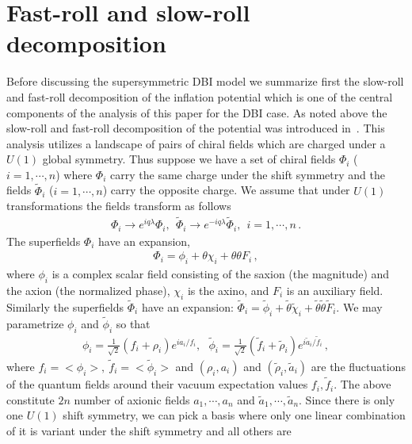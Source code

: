 \documentclass[a4paper,11pt]{article}
\begin{document}
\section{Fast-roll and slow-roll decomposition \label{sec2}}
  Before discussing the supersymmetric DBI model we summarize first the slow-roll and fast-roll decomposition of the
  inflation potential which is one of the central components of the analysis of this paper for the DBI case. As noted above
  the slow-roll and
  fast-roll decomposition of the potential was introduced in~\cite{Nath:2017ihp}.
  This analysis utilizes a landscape of pairs of chiral fields which are charged under a $U(1)$ global symmetry. Thus suppose we have
  a set of chiral fields $\Phi_i$ ($i=1, \cdots, n$) where $\Phi_i$ carry the same charge under the shift symmetry and the fields
  $\tilde \Phi_i$ ($i=1, \cdots, n$) carry the opposite charge. We assume that under $U(1)$ transformations the fields transform
  as follows
  \begin{align}
    \Phi_i\to e^{i q \lambda} \Phi_i, ~~\tilde \Phi_i\to e^{-i q \lambda} \tilde \Phi_i, ~~i=1, \cdots, n\,.
  \end{align}
  The superfields ${\Phi}_{i}$ have an expansion,
  \begin{align}
    {\Phi}_{i} = {\phi}_{i} + \theta {\chi}_{i} + \theta \theta {F}_{i}\,,
  \end{align}
  where ${\phi}_{i}$ is a complex scalar field consisting of the saxion (the magnitude) and the axion (the normalized phase), ${\chi}_{i}$ is the axino, and ${F}_{i}$ is an auxiliary field.
  Similarly the superfields $\tilde {\Phi}_{i}$ have an expansion:
  $\tilde {\Phi}_{i} = \tilde {\phi}_{i} + \tilde \theta \tilde {\chi}_{i} + \tilde\theta \tilde \theta \tilde{F}_{i}$.
  We may parametrize $\phi_i$ and $\tilde \phi_i$ so that
  \begin{align}
    \phi_i = \frac{1}{\sqrt 2}(f_i + \rho_i) e^{ia_i/f_i}, ~~~\tilde\phi_i = \frac{1}{\sqrt 2}(\tilde f_i + \tilde \rho_i) e^{i\tilde a_i/\tilde f_i}\,,
  \end{align}
  where $f_i= <\phi_i> ,~\tilde f_i= <\tilde\phi_i>$ and $(\rho_i, a_i)$ and $(\tilde \rho_i, \tilde a_i)$
  are the fluctuations of the quantum fields around their vacuum expectation values $f_i, \tilde f_i$.
  The above constitute
  $2n$ number of axionic fields $a_1, \cdots, a_n$ and $\tilde a_1, \cdots, \tilde a_n$.
  Since there is only one $U(1)$ shift symmetry, we can pick a basis where
  only one linear combination of it is variant under the shift symmetry and all others are
\end{document}
